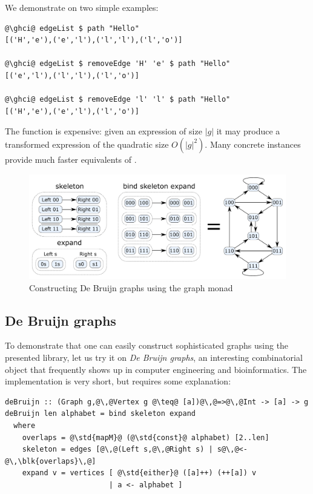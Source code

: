 We demonstrate  on two simple examples:
\begin{verbatim}
@\ghci@ edgeList $ path "Hello"
[('H','e'),('e','l'),('l','l'),('l','o')]

@\ghci@ edgeList $ removeEdge 'H' 'e' $ path "Hello"
[('e','l'),('l','l'),('l','o')]

@\ghci@ edgeList $ removeEdge 'l' 'l' $ path "Hello"
[('H','e'),('e','l'),('l','o')]
\end{verbatim}

\noindent
The  function is expensive: given an expression of size $|g|$
it may produce a transformed expression of the quadratic size $O(|g|^2)$. Many
concrete  instances provide much faster equivalents of .

\begin{figure}
\centerline{\includegraphics[scale=0.3]{fig/De-Bruijn-construction.pdf}}
\vspace{-4mm}
\caption{Constructing De Bruijn graphs using the graph monad\label{fig-de-bruijn}}
\vspace{-4mm}
\end{figure}


\subsection{De Bruijn graphs}

To demonstrate that one can easily construct sophisticated graphs using
the presented library, let us try it on \emph{De Bruijn graphs}, an interesting
combinatorial object that frequently shows up in computer engineering and
bioinformatics. The implementation is very short, but requires some explanation:

\begin{verbatim}
deBruijn :: (Graph g,@\,@Vertex g @\teq@ [a])@\,@=>@\,@Int -> [a] -> g
deBruijn len alphabet = bind skeleton expand
  where
    overlaps = @\std{mapM}@ (@\std{const}@ alphabet) [2..len]
    skeleton = edges [@\,@(Left s,@\,@Right s) | s@\,@<-@\,\blk{overlaps}\,@]
    expand v = vertices [ @\std{either}@ ([a]++) (++[a]) v
                        | a <- alphabet ]
\end{verbatim}


